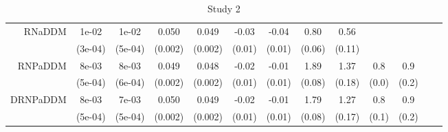 \begin{table}[ht]
\begin{tabular}{|r|cc|cc|cc|cc|cc|cc|}
   \hline
RNaDDM & 1e-02 & 1e-02 & 0.050 & 0.049 & -0.03 & -0.04 & 0.80 & 0.56 &  &  &  &  \\ 
   & (3e-04) & (5e-04) & (0.002) & (0.002) & (0.01) & (0.01) & (0.06) & (0.11) &  &  &  &  \\ 
   \hline
RNPaDDM & 8e-03 & 8e-03 & 0.049 & 0.048 & -0.02 & -0.01 & 1.89 & 1.37 & 0.8 & 0.9 &  &  \\ 
   & (5e-04) & (6e-04) & (0.002) & (0.002) & (0.01) & (0.01) & (0.08) & (0.18) & (0.0) & (0.2) &  &  \\ 
   \hline
DRNPaDDM & 8e-03 & 7e-03 & 0.050 & 0.049 & -0.02 & -0.01 & 1.79 & 1.27 & 0.8 & 0.9 &  &  \\ 
   & (5e-04) & (5e-04) & (0.002) & (0.002) & (0.01) & (0.01) & (0.08) & (0.17) & (0.1) & (0.2) &  &  \\ 
   \hline
\end{tabular}
\caption{Study 2} 
\end{table}
